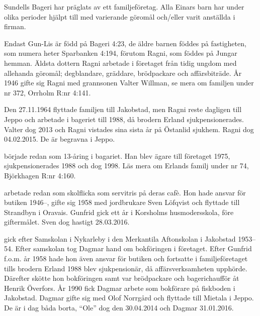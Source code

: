 Sundells Bageri har präglats av ett familjeföretag. Alla Einars barn har under olika perioder hjälpt till med varierande göromål och/eller varit anställda i firman.
\begin{jhchildren}
  \item {}
  \item {}
  \item {}
  \item {}
  \item {}
\end{jhchildren}
Endast Gun-Lis är född på Bageri 4:23, de äldre barnen föddes på fastigheten, som numera heter Sparbanken 4:194, förutom Ragni, som föddes på Jungar hemman. Äldsta dottern Ragni arbetade i företaget från tidig ungdom med allehanda göromål; degblandare, gräddare, brödpackare och affärsbiträde.  År 1946 gifte sig Ragni med grannsonen Valter Willman, se mera om familjen under nr 372, Orrholm R:nr 4:141.

Den 27.11.1964 flyttade familjen till Jakobstad, men Ragni reste dagligen till Jeppo och arbetade i bageriet till 1988, då brodern Erland sjukpensionerades. Valter dog 2013 och Ragni vistades sina sista år på Östanlid sjukhem. Ragni dog 04.02.2015. De är begravna i Jeppo.

 började redan som 13-åring i bagariet. Han blev ägare till företaget 1975, sjukpensionerades 1988 och dog 1998. Läs mera om Erlands familj under nr 74, Björkhagen R:nr 4:160.

 arbetade redan som skolflicka som servitris på deras cafè. Hon hade ansvar för butiken 1946--, gifte sig 1958 med jordbrukare Sven Löfqvist och flyttade till Strandbyn i Oravais. Gunfrid gick ett år i Korsholms husmodersskola, före giftermålet. Sven dog hastigt 28.03.2016.

 gick efter Samskolan i Nykarleby i den Merkantila Aftonskolan i Jakobstad 1953--54. Efter samskolan tog Dagmar hand om bokföringen i företaget. Efter Gunfrid f.o.m. år 1958 hade hon även ansvar för butiken och fortsatte i familjeföretaget tills brodern Erland 1988 blev sjukpensionär, då affärsverksamheten upphörde. Därefter skötte hon bokföringen samt var brödpackare och bagerichaufför åt Henrik Överfors. År 1990 fick Dagmar arbete som bokförare på fiskboden i Jakobstad. Dagmar gifte sig med Olof Norrgård och flyttade till Mietala i Jeppo. De är i dag båda borta, ``Ole'' dog den 30.04.2014 och Dagmar 31.01.2016.

